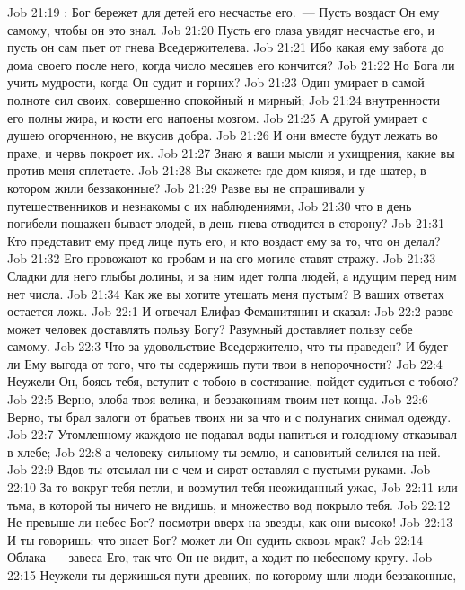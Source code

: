 \vs Job 21:19 : Бог бережет для детей его несчастье его.~--- Пусть воздаст Он ему самому, чтобы он это знал.
\vs Job 21:20 Пусть его глаза увидят несчастье его, и пусть он сам пьет от гнева Вседержителева.
\vs Job 21:21 Ибо какая ему забота до дома своего после него, когда число месяцев его кончится?
\vs Job 21:22 Но Бога ли учить мудрости, когда Он судит и горних?
\vs Job 21:23 Один умирает в самой полноте сил своих, совершенно спокойный и мирный;
\vs Job 21:24 внутренности его полны жира, и кости его напоены мозгом.
\vs Job 21:25 А другой умирает с душею огорченною, не вкусив добра.
\vs Job 21:26 И они вместе будут лежать во прахе, и червь покроет их.
\vs Job 21:27 Знаю я ваши мысли и ухищрения, какие вы против меня сплетаете.
\vs Job 21:28 Вы скажете: где дом князя, и где шатер, в котором жили беззаконные?
\vs Job 21:29 Разве вы не спрашивали у путешественников и незнакомы с их наблюдениями,
\vs Job 21:30 что в день погибели пощажен бывает злодей, в день гнева отводится в сторону?
\vs Job 21:31 Кто представит ему пред лице путь его, и кто воздаст ему за то, что он делал?
\vs Job 21:32 Его провожают ко гробам и на его могиле ставят стражу.
\vs Job 21:33 Сладки для него глыбы долины, и за ним идет толпа людей, а идущим перед ним нет числа.
\vs Job 21:34 Как же вы хотите утешать меня пустым? В ваших ответах остается  ложь.
\vs Job 22:1 И отвечал Елифаз Феманитянин и сказал:
\vs Job 22:2 разве может человек доставлять пользу Богу? Разумный доставляет пользу себе самому.
\vs Job 22:3 Что за удовольствие Вседержителю, что ты праведен? И будет ли Ему выгода от того, что ты содержишь пути твои в непорочности?
\vs Job 22:4 Неужели Он, боясь тебя, вступит с тобою в состязание, пойдет судиться с тобою?
\vs Job 22:5 Верно, злоба твоя велика, и беззакониям твоим нет конца.
\vs Job 22:6 Верно, ты брал залоги от братьев твоих ни за что и с полунагих снимал одежду.
\vs Job 22:7 Утомленному жаждою не подавал воды напиться и голодному отказывал в хлебе;
\vs Job 22:8 а человеку сильному ты  землю, и сановитый селился на ней.
\vs Job 22:9 Вдов ты отсылал ни с чем и сирот оставлял с пустыми руками.
\vs Job 22:10 За то вокруг тебя петли, и возмутил тебя неожиданный ужас,
\vs Job 22:11 или тьма, в которой ты ничего не видишь, и множество вод покрыло тебя.
\vs Job 22:12 Не превыше ли небес Бог? посмотри вверх на звезды, как они высоко!
\vs Job 22:13 И ты говоришь: что знает Бог? может ли Он судить сквозь мрак?
\vs Job 22:14 Облака~--- завеса Его, так что Он не видит, а ходит  по небесному кругу.
\vs Job 22:15 Неужели ты держишься пути древних, по которому шли люди беззаконные,
